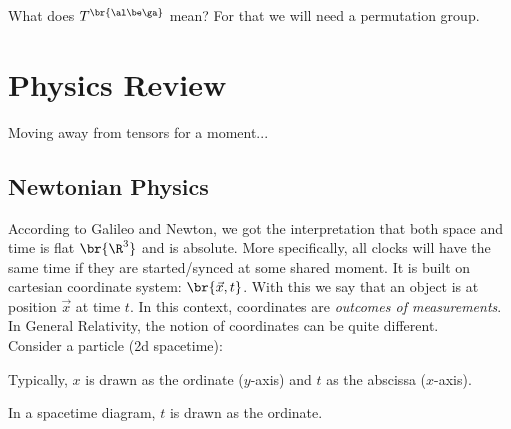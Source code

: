 \documentclass{article}
\begin{document}
What does $T^{\br{\al\be\ga}}$ mean? For that we will need a permutation group.

\section{Physics Review}

Moving away from tensors for a moment... \\

\subsection{Newtonian Physics}

According to Galileo and Newton, we got the interpretation that both space and time is flat $\br{\R^3}$ and is absolute. More specifically, all clocks will have the same time if they are started/synced at some shared moment. It is built on cartesian coordinate system: $\br{\vec{x}, t}$. With this we say that an object is at position $\vec{x}$ at time $t$. In this context, coordinates are \textit{outcomes of measurements}. In General Relativity, the notion of coordinates can be quite different. \\

Consider a particle (2d spacetime):

\begin{center}
\end{center}

Typically, $x$ is drawn as the ordinate ($y$-axis) and $t$ as the abscissa ($x$-axis).


In a spacetime diagram, $t$ is drawn as the ordinate.

\begin{center}
\end{center}
\end{document}
